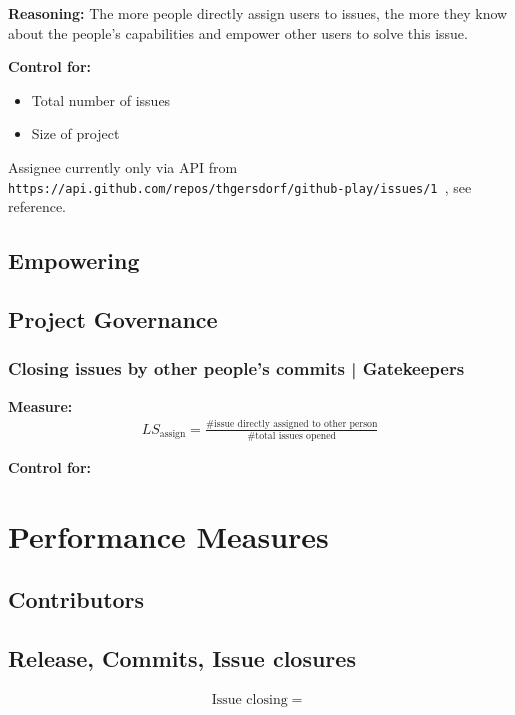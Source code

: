 \documentclass[a4paper,10pt]{article}
\begin{document}
\textbf{Reasoning:}
The more people directly assign users to issues, the more they know about the people's capabilities and empower other users to solve this issue.



\textbf{Control for:}
\begin{itemize}
 \item Total number of issues
\item Size of project
\end{itemize}



Assignee currently only via API from \texttt{ https://api.github.com/repos/thgersdorf/github-play/issues/1
}, see reference.



\subsection{Empowering}


\subsection{Project Governance}


\subsubsection{Closing issues by other people's commits | Gatekeepers}
\textbf{Measure:}
\begin{align}
 LS_{\text{assign}} = \frac{\text{\# issue directly assigned to other person}}{\text{\# total issues opened}} 
\end{align}

\textbf{Control for:}




\section{Performance Measures}
\subsection{Contributors}
\subsection{Release, Commits, Issue closures}

\begin{align}
 \text{Issue closing} = \frac{}{}
\end{align}
\end{document}
